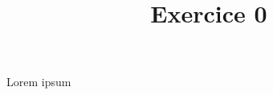 \documentclass[12pt,doclabel=Exercice,solution=true]{uqtrassignment}
\title{Exercice 0}
\begin{document}
\maketitle

\begin{problem}{Lorem ipsum}

\lipsum[1]

\begin{solution}
\lipsum[2]
\end{solution}
\end{problem}
\end{document}
